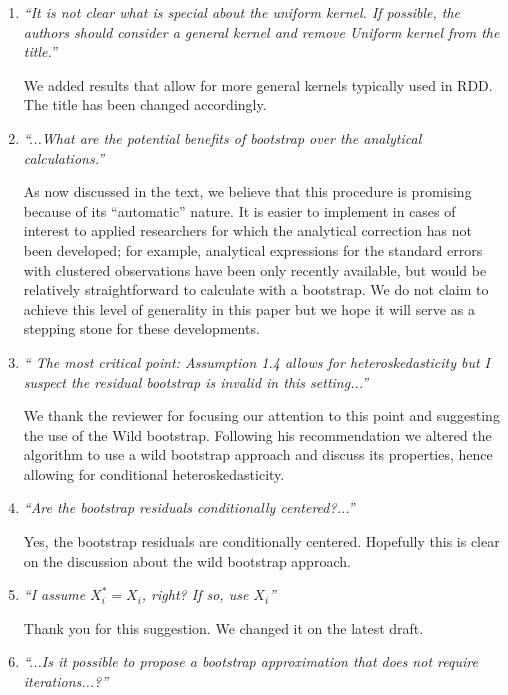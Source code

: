 \documentclass[12pt,fleqn]{article}
\begin{document}
\begin{enumerate}
 \item  \textit{``It is not clear what is special about the uniform kernel. If possible, the authors should consider a general kernel and remove Uniform kernel from the title.''}

 We added results that allow for more general kernels typically used in RDD. The title has been changed accordingly.

\item \textit{``...What are the potential benefits of bootstrap over the analytical calculations.''}

  As now discussed in the text, we believe that this procedure is promising
  because of its ``automatic'' nature. It is easier to implement in cases of
  interest to applied researchers for which the analytical correction has not
  been developed; for example, analytical expressions for the standard errors
  with clustered observations have been only recently available, but would be
  relatively straightforward to calculate with a bootstrap.  We do not claim to
  achieve this level of generality in this paper but we hope it will serve as a
  stepping stone for these developments.

\item \textit{`` The most critical point: Assumption 1.4 allows for heteroskedasticity but I suspect the residual bootstrap is invalid in this setting...''}

 We thank the reviewer for focusing our attention to this point and suggesting the use of the Wild bootstrap. Following his recommendation we altered the algorithm to use a wild bootstrap approach and discuss its properties, hence allowing for conditional heteroskedasticity.

\item \textit{``Are the bootstrap residuals conditionally centered?...''}

 Yes, the bootstrap residuals are conditionally centered. Hopefully this is clear on the discussion about the wild bootstrap approach.

\item \textit{``I assume $X_{i}^{*}=X_{i}$, right? If so, use $X_{i}$''}

Thank you for this suggestion. We changed it on the latest draft.

\item \textit{``...Is it possible to propose a bootstrap approximation that does not require iterations...?''}


\end{enumerate}
\end{document}
